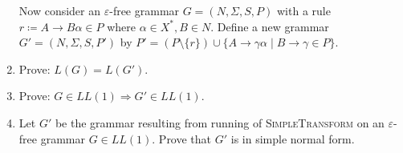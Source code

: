 \begin{exercise}{60}
\begin{enumerate}
Now consider an $\varepsilon$-free grammar $G=(N,\Sigma,S,P)$ with a rule $r \coloneqq A \rightarrow B \alpha \in P$ where $\alpha \in X^{*}, B \in N$. Define a new grammar $G'=(N,\Sigma,S,P')$ by $P'=(P \setminus \{r\}) \cup \{ A \rightarrow \gamma \alpha \mid B \rightarrow \gamma \in P \}$. 

\item Prove:  $L(G)=L(G')$.
\item Prove: $G \in LL(1) \Rightarrow G' \in LL(1)$.
\item Let $G'$ be the grammar resulting from running of \textsc{SimpleTransform} on an $\varepsilon$-free grammar $G\in LL(1)$. Prove that $G'$ is in simple normal form.
\end{enumerate}

\end{exercise}
%
%
%
